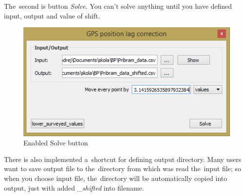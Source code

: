 The~second is button \textit{Solve}. You can’t solve anything until you have defined input, output and
value of shift.

  \begin{figure}[H]
   \centering
	\includegraphics[scale=0.75]{./pictures/solve.png}
	\caption[Enabled Solve button]{Enabled Solve button}
      \label{fig:solve}
  \end{figure}

There is also implemented a~shortcut for defining output
directory. Many users want to save output file to
the~directory from which was read the~input file;
so when you choose input file, the~directory will
be automatically copied into output,
just with added \textit{\_shifted} into filename. 

